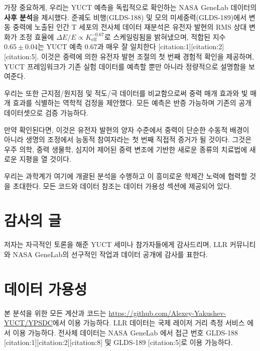 \documentclass[12pt,a4paper]{article}
\theoremstyle{remark}
\newcommand{\Keff}{K_{\mathrm{eff}}}
\begin{document}
	가장 중요하게, 우리는 YUCT 예측을 독립적으로 확인하는 NASA GeneLab 데이터의 \textbf{사후 분석}을 제시했다. 준궤도 비행(GLDS-188) 및 모의 미세중력(GLDS-189)에서 변동 중력에 노출된 인간 T 세포의 전사체 데이터 재분석은 유전자 발현의 RMS 상대 변화가 조정 효율에 \(\Delta E/E \propto \Keff^{-0.67}\)로 스케일링됨을 밝혀냈으며, 적합된 지수 \(0.65 \pm 0.04\)는 YUCT 예측 \(0.67\)과 매우 잘 일치한다 [citation:1][citation:2][citation:5]. 이것은 중력에 의한 유전자 발현 조절의 첫 번째 경험적 확인을 제공하며, YUCT 프레임워크가 기존 실험 데이터를 예측할 뿐만 아니라 정량적으로 설명함을 보여준다.
	
	우리는 또한 근지점/원지점 및 적도/극 데이터를 비교함으로써 중력 매개 효과와 빛 매개 효과를 식별하는 역학적 검정을 제안했다. 모든 예측은 반증 가능하며 기존의 공개 데이터셋으로 검증 가능하다.
	
	만약 확인된다면, 이것은 유전자 발현의 양자 수준에서 중력이 단순한 수동적 배경이 아니라 생명의 조정에서 능동적 참여자라는 첫 번째 직접적 증거가 될 것이다. 그것은 우주 의학, 중력 생물학, 심지어 제어된 중력 변조에 기반한 새로운 종류의 치료법에 새로운 지평을 열 것이다.
	
	우리는 과학계가 여기에 개괄된 분석을 수행하고 이 흥미로운 학제간 노력에 협력할 것을 초대한다. 모든 코드와 데이터 참조는 데이터 가용성 섹션에 제공되어 있다.
	
	\section*{감사의 글}
	
	저자는 자극적인 토론을 해준 YUCT 세미나 참가자들에게 감사드리며, LLR 커뮤니티와 NASA GeneLab의 선구적인 작업과 데이터 공개에 감사를 표한다.
	
	\section*{데이터 가용성}
	
	본 분석을 위한 모든 계산과 코드는 \url{https://github.com/Alexey-Yakushev-YUCT/YPSDC}에서 이용 가능하다. LLR 데이터는 국제 레이저 거리 측정 서비스 \cite{ILRS}에서 이용 가능하다. 전사체 데이터는 NASA GeneLab \cite{NASA-GeneLab}에서 접근 번호 GLDS-188 [citation:1][citation:2][citation:8] 및 GLDS-189 [citation:5]로 이용 가능하다.
	
\end{document}
